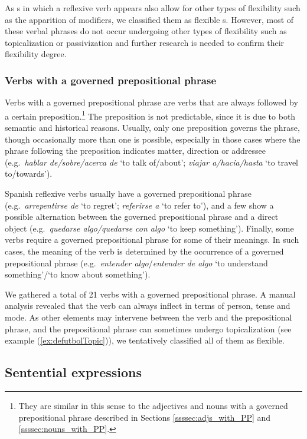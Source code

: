 \documentclass[output=paper]{langsci/langscibook}
\begin{document}
As \mwe s in which a reflexive verb appears also allow for other types of flexibility such as the apparition of modifiers, we classified them as flexible \mwe s.
However, most of these verbal phrases do not occur undergoing other types of flexibility such as topicalization or passivization and further research is needed to confirm their flexibility degree.

\subsubsection{Verbs with a governed prepositional phrase}
\label{sssec:governedPPs}

Verbs with a governed prepositional phrase are verbs that are always followed by a certain preposition.\footnote{They are similar in this sense to the adjectives and nouns with a governed prepositional phrase described in Sections \ref{ssssec:adjs_with_PP} and \ref{ssssec:nouns_with_PP}.}
The preposition is not predictable, since it is due to both semantic and historical reasons. 
Usually, only one preposition governs the phrase, though occasionally more than one is possible, especially in those cases where the phrase following the preposition indicates matter, direction or addressee (e.g.\ \textit{hablar de/sobre/acerca de} `to talk of/about'; \textit{viajar a/hacia/hasta} `to travel to/towards').


Spanish reflexive verbs usually have a governed prepositional phrase (e.g.\ \textit{arrepentirse de} `to regret'; \textit{referirse a} `to refer to'), and a few show a possible alternation between the governed prepositional phrase and a direct object (e.g.\ \textit{quedarse algo/quedarse con algo} `to keep something').
Finally, some verbs require a governed prepositional phrase for some of their meanings.
In such cases, the meaning of the verb is determined by the occurrence of a governed prepositional phrase (e.g.\ \textit{entender algo}/\textit{entender de algo} `to understand something'/`to know about something').

We gathered a total of 21 verbs with a governed prepositional phrase.
A manual analysis revealed that the verb can always inflect in terms of person, tense and mode. 
As other elements may intervene between the verb and the prepositional phrase, and the prepositional phrase can sometimes undergo topicalization (see example (\ref{ex:defutbolTopic})), we tentatively classified all of them as flexible.

\subsection{Sentential expressions}
\label{ssec:sentential-expressions}
\end{document}

